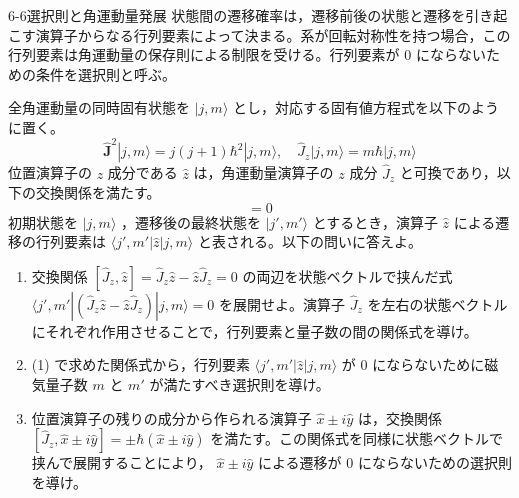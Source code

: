 
\label{prob:6-6}
\begin{mondai}{6-6}{選択則と角運動量}{発展}
状態間の遷移確率は，遷移前後の状態と遷移を引き起こす演算子からなる行列要素によって決まる。系が回転対称性を持つ場合，この行列要素は角運動量の保存則による制限を受ける。行列要素が 0 にならないための条件を選択則と呼ぶ。
\par
全角運動量の同時固有状態を $|j, m\rangle$ とし，対応する固有値方程式を以下のように置く。
\begin{equation*}
\hat{\boldsymbol{J}}^2 |j, m\rangle = j(j+1)\hbar^2 |j, m\rangle, \quad \hat{J}_z |j, m\rangle = m\hbar |j, m\rangle
\end{equation*}
位置演算子の $z$ 成分である $\hat{z}$ は，角運動量演算子の $z$ 成分 $\hat{J}_z$ と可換であり，以下の交換関係を満たす。
\begin{equation*}
[\hat{J}_z, \hat{z}] = 0
\end{equation*}
初期状態を $|j, m\rangle$ ，遷移後の最終状態を $|j', m'\rangle$ とするとき，演算子 $\hat{z}$ による遷移の行列要素は $\langle j', m'|\hat{z}|j, m\rangle$ と表される。以下の問いに答えよ。

\begin{enumerate}
  \item 交換関係 $[\hat{J}_z, \hat{z}] = \hat{J}_z \hat{z} - \hat{z} \hat{J}_z = 0$ の両辺を状態ベクトルで挟んだ式 $\langle j', m'| (\hat{J}_z \hat{z} - \hat{z} \hat{J}_z) |j, m\rangle = 0$ を展開せよ。演算子 $\hat{J}_z$ を左右の状態ベクトルにそれぞれ作用させることで，行列要素と量子数の間の関係式を導け。

  \item (1) で求めた関係式から，行列要素 $\langle j', m'|\hat{z}|j, m\rangle$ が 0 にならないために磁気量子数 $m$ と $m'$ が満たすべき選択則を導け。

  \item 位置演算子の残りの成分から作られる演算子 $\hat{x} \pm i\hat{y}$ は，交換関係 $[\hat{J}_z, \hat{x} \pm i\hat{y}] = \pm\hbar (\hat{x} \pm i\hat{y})$ を満たす。この関係式を同様に状態ベクトルで挟んで展開することにより， $\hat{x} \pm i\hat{y}$ による遷移が 0 にならないための選択則を導け。
\end{enumerate}
\end{mondai}

